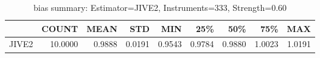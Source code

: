 \begin{table}[ht]
\centering
\caption{bias summary: Estimator=JIVE2, Instruments=333, Strength=0.60}
\begin{tabular}{lrrrrrrrr}
\toprule
 & COUNT & MEAN & STD & MIN & 25\% & 50\% & 75\% & MAX \\
\midrule
JIVE2 & 10.0000 & 0.9888 & 0.0191 & 0.9543 & 0.9784 & 0.9880 & 1.0023 & 1.0191 \\
\bottomrule
\end{tabular}
\end{table}
